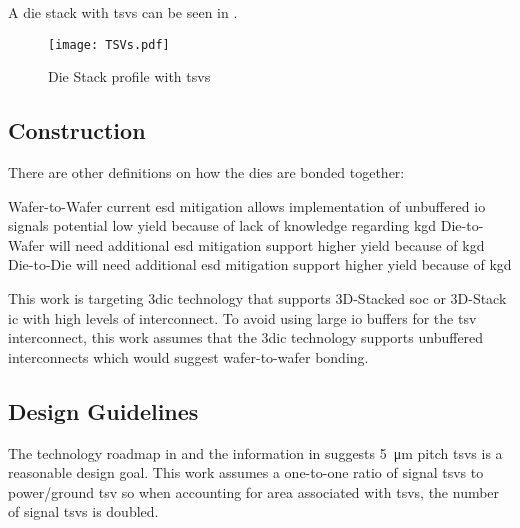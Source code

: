 A die stack with \acp{tsv} can be seen in .

\begin{figure}[h]
\centering
\captionsetup{justification=centering}
\captionsetup{width=.9\linewidth}
\centerline{
\mbox{\texttt{[image: TSVs.pdf]}}
}
\caption{Die Stack profile \cite{itrs2015_interconn} with \acp{tsv}}
\label{fig:tsv}
\end{figure}

\subsection{Construction}
\label{sec:3dic construction}

There are other definitions on how the dies are bonded together:
\begin{outline}
  \1 Wafer-to-Wafer
    \2 current \ac{esd} mitigation allows implementation of unbuffered \ac{io} signals
    \2 potential low yield because of lack of knowledge regarding \ac{kgd}
  \1 Die-to-Wafer
    \2 will need additional \ac{esd} mitigation support
    \2 higher yield because of \ac{kgd}
  \1 Die-to-Die
    \2 will need additional \ac{esd} mitigation support
    \2 higher yield because of \ac{kgd}
\end{outline}

This work is targeting \ac{3dic} technology that supports 3D-Stacked \ac{soc} or 3D-Stack \ac{ic} with high levels of interconnect.
To avoid using large \ac{io} buffers for the \ac{tsv} interconnect, this work assumes that the \ac{3dic} technology supports unbuffered interconnects which would suggest wafer-to-wafer bonding.
\iffalse because of the existing \ac{esd} mitigation during wafer handling although it is anticipated that improved \ac{esd} mitigation will be introduced in future manufacturing steps. \fi

\subsection{Design Guidelines}
\label{sec:3dic Design Guidelines}

The technology roadmap in \cite{itrs2015_interconn} and the information in \cite{patti2014} suggests \SI{5}{\micro\meter} pitch \acp{tsv} is a reasonable design goal. 
This work assumes a one-to-one ratio of signal \acp{tsv} to power/ground \ac{tsv} so when accounting for area associated with \acp{tsv}, the number of signal \acp{tsv} is doubled.

